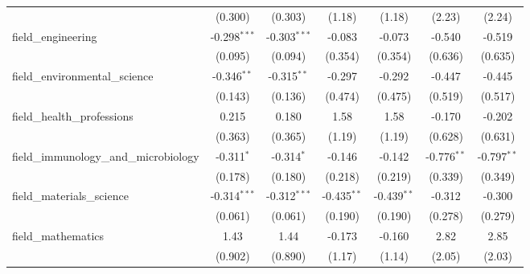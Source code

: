 \begin{tabular}{lcccccc}
                                                               & (0.300)        & (0.303)        & (1.18)         & (1.18)         & (2.23)         & (2.24)\\   
   field\_engineering                                          & -0.298$^{***}$ & -0.303$^{***}$ & -0.083         & -0.073         & -0.540         & -0.519\\   
                                                               & (0.095)        & (0.094)        & (0.354)        & (0.354)        & (0.636)        & (0.635)\\   
   field\_environmental\_science                               & -0.346$^{**}$  & -0.315$^{**}$  & -0.297         & -0.292         & -0.447         & -0.445\\   
                                                               & (0.143)        & (0.136)        & (0.474)        & (0.475)        & (0.519)        & (0.517)\\   
   field\_health\_professions                                  & 0.215          & 0.180          & 1.58           & 1.58           & -0.170         & -0.202\\   
                                                               & (0.363)        & (0.365)        & (1.19)         & (1.19)         & (0.628)        & (0.631)\\   
   field\_immunology\_and\_microbiology                        & -0.311$^{*}$   & -0.314$^{*}$   & -0.146         & -0.142         & -0.776$^{**}$  & -0.797$^{**}$\\   
                                                               & (0.178)        & (0.180)        & (0.218)        & (0.219)        & (0.339)        & (0.349)\\   
   field\_materials\_science                                   & -0.314$^{***}$ & -0.312$^{***}$ & -0.435$^{**}$  & -0.439$^{**}$  & -0.312         & -0.300\\   
                                                               & (0.061)        & (0.061)        & (0.190)        & (0.190)        & (0.278)        & (0.279)\\   
   field\_mathematics                                          & 1.43           & 1.44           & -0.173         & -0.160         & 2.82           & 2.85\\   
                                                               & (0.902)        & (0.890)        & (1.17)         & (1.14)         & (2.05)         & (2.03)\\   

\end{tabular}
